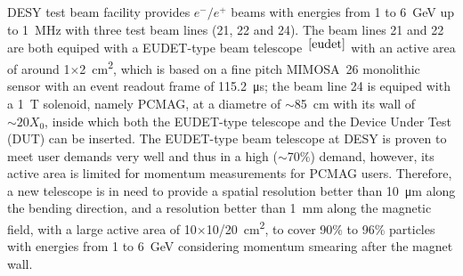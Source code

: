 DESY test beam facility provides $e^-/e^+$ beams with energies from 1 to \SI{6}{\GeV} up to \SI{1}{\MHz}
with three test beam lines (21, 22 and 24).
The beam lines 21 and 22 are both equiped with a EUDET-type beam telescope~$^{\cite{eudet}}$ with an active area of around 1$\times$\SI{2}{\square\centi\metre},
which is based on a fine pitch \uppercase{mimosa}~26 monolithic sensor with an event readout frame of \SI{115.2}{\micro\second};
the beam line 24 is equiped with a \SI{1}{\tesla} solenoid, namely PCMAG, at a diametre of $\sim$\SI{85}{\centi\metre} with its wall of $\sim20X_0$,
inside which both the EUDET-type telescope and the Device Under Test (DUT) can be inserted.
The EUDET-type beam telescope at DESY is proven to meet user demands very well and thus in a high ($\sim$70\%) demand,
however, its active area is limited for momentum measurements for PCMAG users.
Therefore, a new telescope is in need to provide a spatial resolution better than \SI{10}{\micro\metre} along the bending direction, and a resolution better than \SI{1}{\milli\metre} along the magnetic field,
with a large active area of 10$\times$10/\SI{20}{\square\centi\metre},
to cover 90\% to 96\% particles with energies from 1 to \SI{6}{\GeV} considering momentum smearing after the magnet wall.

